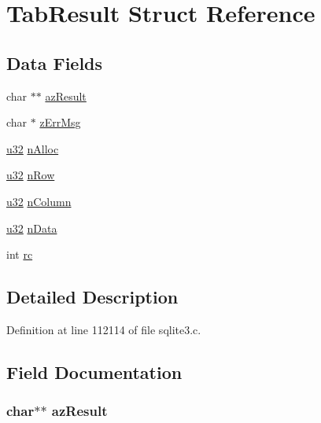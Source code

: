 \hypertarget{struct_tab_result}{}\section{Tab\+Result Struct Reference}
\label{struct_tab_result}
\subsection*{Data Fields}
\begin{DoxyCompactItemize}
\item 
char $\ast$$\ast$ \hyperlink{struct_tab_result_a6279062b33ce8e88edf14d277768a300}{az\+Result}
\item 
char $\ast$ \hyperlink{struct_tab_result_a6fcf95fd4e53f09793171bd5b704ac9a}{z\+Err\+Msg}
\item 
\hyperlink{sqlite3_8c_a03ad5adfaeb9b7640dde78a0cc390319}{u32} \hyperlink{struct_tab_result_ab29b3b053096207217eb8b705a8b4816}{n\+Alloc}
\item 
\hyperlink{sqlite3_8c_a03ad5adfaeb9b7640dde78a0cc390319}{u32} \hyperlink{struct_tab_result_abe7279928404d340672677e1d5bdf46f}{n\+Row}
\item 
\hyperlink{sqlite3_8c_a03ad5adfaeb9b7640dde78a0cc390319}{u32} \hyperlink{struct_tab_result_a98026c67ef3ea63d22c20128486e35d5}{n\+Column}
\item 
\hyperlink{sqlite3_8c_a03ad5adfaeb9b7640dde78a0cc390319}{u32} \hyperlink{struct_tab_result_aa183c5f7ed54095839152f360ea79208}{n\+Data}
\item 
int \hyperlink{struct_tab_result_ac6509c6fe4cbf7bde170597172f8a288}{rc}
\end{DoxyCompactItemize}


\subsection{Detailed Description}


Definition at line 112114 of file sqlite3.\+c.



\subsection{Field Documentation}
\hypertarget{struct_tab_result_a6279062b33ce8e88edf14d277768a300}{}
\subsubsection[{az\+Result}]{\setlength{\rightskip}{0pt plus 5cm}char$\ast$$\ast$ az\+Result}\label{struct_tab_result_a6279062b33ce8e88edf14d277768a300}


